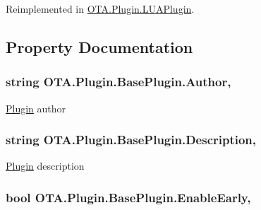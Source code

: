 Reimplemented in \hyperlink{class_o_t_a_1_1_plugin_1_1_l_u_a_plugin_a3b793a6fdc8bd554c10cbb59256b1499}{O\+T\+A.\+Plugin.\+L\+U\+A\+Plugin}.



\subsection{Property Documentation}
\hypertarget{class_o_t_a_1_1_plugin_1_1_base_plugin_a226fdb70bc1df6f65d786809dec4a71d}{}
\subsubsection[{Author}]{\setlength{\rightskip}{0pt plus 5cm}string O\+T\+A.\+Plugin.\+Base\+Plugin.\+Author\hspace{0.3cm}{\ttfamily [get]}, {\ttfamily [set]}}\label{class_o_t_a_1_1_plugin_1_1_base_plugin_a226fdb70bc1df6f65d786809dec4a71d}


\hyperlink{namespace_o_t_a_1_1_plugin}{Plugin} author 

\hypertarget{class_o_t_a_1_1_plugin_1_1_base_plugin_aaf578319bed5a9ceb64b2878f132ed66}{}
\subsubsection[{Description}]{\setlength{\rightskip}{0pt plus 5cm}string O\+T\+A.\+Plugin.\+Base\+Plugin.\+Description\hspace{0.3cm}{\ttfamily [get]}, {\ttfamily [set]}}\label{class_o_t_a_1_1_plugin_1_1_base_plugin_aaf578319bed5a9ceb64b2878f132ed66}


\hyperlink{namespace_o_t_a_1_1_plugin}{Plugin} description 

\hypertarget{class_o_t_a_1_1_plugin_1_1_base_plugin_a752ecf7ec3fa008001b12d1728daa91b}{}
\subsubsection[{Enable\+Early}]{\setlength{\rightskip}{0pt plus 5cm}bool O\+T\+A.\+Plugin.\+Base\+Plugin.\+Enable\+Early\hspace{0.3cm}{\ttfamily [get]}, {\ttfamily [set]}}\label{class_o_t_a_1_1_plugin_1_1_base_plugin_a752ecf7ec3fa008001b12d1728daa91b}


